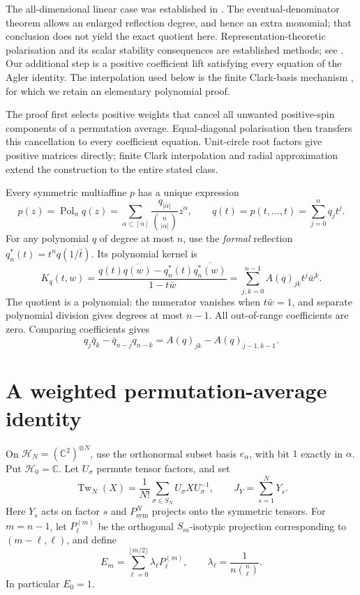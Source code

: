 \documentclass[11pt,a4paper]{article}
\theoremstyle{remark}\newtheorem{remark}[theorem]{Remark}
\DeclareMathOperator{\Tw}{Tw}
\DeclareMathOperator{\Pol}{Pol}
\newcommand{\C}{\mathbb C}
\newcommand{\HH}{\mathcal H}
\newcommand{\Ps}{P_{\mathrm{sym}}}
\newcommand{\bin}[2]{\binom{#1}{#2}}
\begin{document}
The all-dimensional linear case was established in \cite[Corollary 5.7]{linear}. The eventual-denominator theorem \cite[Corollary 3.2]{eventual} allows an enlarged reflection degree, and hence an extra monomial; that conclusion does not yield the exact quotient here. Representation-theoretic polarisation and its scalar stability consequences are established methods; see \cite[Propositions A.7 and B.1]{leake}. Our additional step is a positive coefficient lift satisfying every equation of the Agler identity. The interpolation used below is the finite Clark-basis mechanism \cite{clark}, for which we retain an elementary polynomial proof.

The proof first selects positive weights that cancel all unwanted positive-spin components of a permutation average. Equal-diagonal polarisation then transfers this cancellation to every coefficient equation. Unit-circle root factors give positive matrices directly; finite Clark interpolation and radial approximation extend the construction to the entire stated class.

Every symmetric multiaffine $p$ has a unique expression
\begin{equation}\label{eq:pol}
 p(z)=\Pol_n q(z)=\sum_{\alpha\subset[n]}
       \frac{q_{|\alpha|}}{\bin n{|\alpha|}}z^\alpha,
 \qquad q(t)=p(t,\ldots,t)=\sum_{j=0}^n q_jt^j.
\end{equation}
For any polynomial $q$ of degree at most $n$, use the \emph{formal} reflection
$q_n^*(t)=t^n\overline{q(1/\bar t)}$. Its polynomial kernel is
\begin{equation}\label{eq:K}
 K_q(t,w)=\frac{q(t)\overline{q(w)}-q_n^*(t)\overline{q_n^*(w)}}{1-t\bar w}
         =\sum_{j,k=0}^{n-1} A(q)_{jk}t^j\bar w^k.
\end{equation}
The quotient is a polynomial: the numerator vanishes when $t\bar w=1$, and separate polynomial division gives degrees at most $n-1$. All out-of-range coefficients are zero. Comparing coefficients gives
\begin{equation}\label{eq:diff}
 q_j\bar q_k-\bar q_{n-j}q_{n-k}=A(q)_{jk}-A(q)_{j-1,k-1}.
\end{equation}

\section{A weighted permutation-average identity}
On $\HH_N=(\C^2)^{\otimes N}$, use the orthonormal subset basis $e_\alpha$, with bit $1$ exactly in $\alpha$. Put $\HH_0=\C$. Let $U_\sigma$ permute tensor factors, and set
\[
 \Tw_N(X)=\frac1{N!}\sum_{\sigma\in S_N}U_\sigma XU_\sigma^{-1},
 \qquad J_Y=\sum_{s=1}^N Y_s.
\]
Here $Y_s$ acts on factor $s$ and $\Ps^N$ projects onto the symmetric tensors.
For $m=n-1$, let $P_\ell^{(m)}$ be the orthogonal $S_m$-isotypic projection corresponding to $(m-\ell,\ell)$, and define
\begin{equation}\label{eq:E}
 E_m=\sum_{\ell=0}^{\lfloor m/2\rfloor}\lambda_\ell P_\ell^{(m)},
 \qquad \lambda_\ell=\frac1{n\bin n\ell}.
\end{equation}
In particular $E_0=1$.
\end{document}
